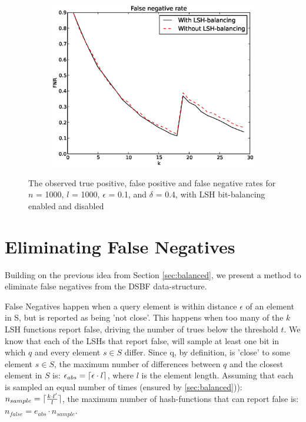 \documentclass[a4paper,11pt]{article}
\DeclarePairedDelimiter{\ceil}{\lceil}{\rceil}
\begin{document}
\begin{figure}[H]
\begin{subfigure}{.5\textwidth}
  \includegraphics[width=.95\linewidth]{bitbalancing_FNR1}
\end{subfigure}
\caption{The observed true positive, false positive and false negative rates for $n$ = 1000, $l$ = 1000, $\epsilon$ = 0.1, and $\delta$ = 0.4, with LSH bit-balancing enabled and disabled}
\label{fig:bitbalance-fpnr}
\end{figure}


\section{Eliminating False Negatives}
Building on the previous idea from Section \ref{sec:balanced}, we present a method to eliminate false negatives from the DSBF data-structure.

False Negatives \label{p:fn}happen when a query element is within distance $\epsilon$ of an element in S, but is reported as being 'not close'. This happens when too many of the $k$ LSH functions report false, driving the number of trues below the threshold $t$. We know that each of the LSHs that report false, will sample at least one bit in which $q$ and every element $s \in S$ differ. Since q, by definition, is 'close' to some element $s \in S$, the maximum number of differences between $q$ and the closest element in $S$ is: $\epsilon_{abs} = \ceil{\epsilon \cdot l}$, where $l$ is the element length. Assuming that each is sampled an equal number of times (ensured by \ref{sec:balanced})): $n_{sample} = \ceil{\frac{k \cdot l{'}}{l}}$, the maximum number of hash-functions that can report false is: $n_{false} = e_{abs} \cdot n_{sample}$.
\end{document}
